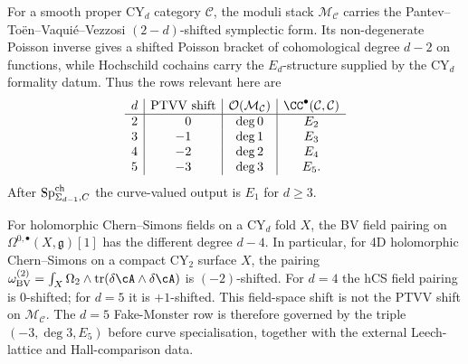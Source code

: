 \begin{proposition}
\label{prop:ptvv-hcs-shift-split}
For a smooth proper CY$_d$ category $\mathcal C$, the moduli stack
$\mathcal M_{\mathcal C}$ carries the Pantev--To\"en--Vaqui\'e--Vezzosi
$(2-d)$-shifted symplectic form. Its non-degenerate Poisson inverse
gives a shifted Poisson bracket of cohomological degree \(d-2\) on functions, while Hochschild
cochains carry the $E_d$-structure supplied by the CY$_d$ formality
datum. Thus the rows relevant here are
\[
\begin{array}{c|c|c|c}
d & \mathrm{PTVV\ shift} & \mathcal O(\mathcal M_{\mathcal C}) &
\CC^\bullet(\mathcal C,\mathcal C) \\\hline
2 & \phantom{-}0 & \deg 0 & E_2\\
3 & -1 & \deg 1 & E_3\\
4 & -2 & \deg 2 & E_4\\
5 & -3 & \deg 3 & E_5 .
\end{array}
\]
After $\mathrm{Sp}^{\mathrm{ch}}_{\Sigma_{d-1},C}$ the curve-valued output is $E_1$ for
$d\geq3$.

For holomorphic Chern--Simons fields on a CY$_d$ fold $X$, the BV
field pairing on $\Omega^{0,\bullet}(X,\mathfrak g)[1]$ has the
different degree $d-4$. In particular, for 4D holomorphic
Chern--Simons on a compact CY$_2$ surface $X$, the pairing
$\omega_{\mathrm{BV}}^{(2)} = \int_X \Omega_2 \wedge \mathrm{tr}(\delta \cA \wedge \delta \cA)$
is $(-2)$-shifted. For $d=4$ the hCS field pairing is $0$-shifted;
for $d=5$ it is $+1$-shifted. This field-space shift is not the PTVV
shift on $\mathcal M_{\mathcal C}$. The $d=5$ Fake-Monster row is therefore governed by the
triple $(-3,\deg 3,E_5)$ before curve specialisation, together with the
external Leech-lattice and Hall-comparison data.
\end{proposition}

